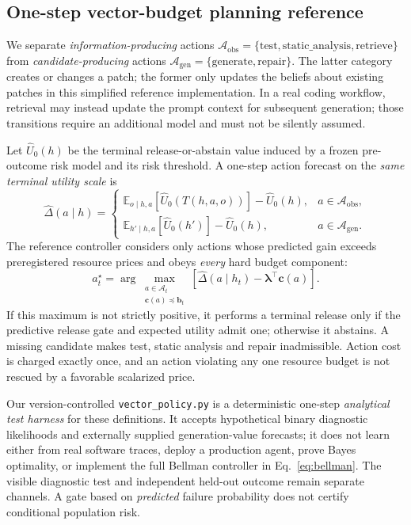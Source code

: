 \documentclass[pdflatex,sn-basic]{sn-jnl}
\begin{document}
\subsection{One-step vector-budget planning reference}\label{sec:planner}

We separate \emph{information-producing} actions
$\mathcal{A}_{\mathrm{obs}}=\{\mathrm{test},\mathrm{static\_analysis},
\mathrm{retrieve}\}$ from \emph{candidate-producing} actions
$\mathcal{A}_{\mathrm{gen}}=\{\mathrm{generate},\mathrm{repair}\}$.
The latter category creates or changes a patch; the former only
updates the beliefs about existing patches in this simplified reference
implementation. In a real coding workflow, retrieval may instead update
the prompt context for subsequent generation; those transitions require
an additional model and must not be silently assumed.

Let $\widehat U_0(h)$ be the terminal release-or-abstain value induced
by a frozen pre-outcome risk model and its risk threshold. A one-step
action forecast on the \emph{same terminal utility scale} is
\begin{equation}
 \widehat{\Delta}(a\mid h)=
 \begin{cases}
 \mathbb{E}_{o\mid h,a}
  [\widehat U_0(T(h,a,o))]-\widehat U_0(h),
 & a\in\mathcal{A}_{\mathrm{obs}},\\
 \mathbb{E}_{h'\mid h,a}
  [\widehat U_0(h')]-\widehat U_0(h),
 & a\in\mathcal{A}_{\mathrm{gen}}.
 \end{cases}
 \label{eq:one_step_gain}
\end{equation}
The reference controller considers only actions whose predicted gain
exceeds preregistered resource prices and obeys \emph{every} hard
budget component:
\begin{equation}
 a_t^\star=\arg\max_{\substack{a\in\mathcal A_t\\
 \mathbf c(a)\preceq\mathbf b_t}}
 \left[\widehat{\Delta}(a\mid h_t)
 -\boldsymbol\lambda^\top\mathbf c(a)\right].
 \label{eq:myopic}
\end{equation}
If this maximum is not strictly positive, it performs a terminal
release only if the predictive release gate and expected utility admit
one; otherwise it abstains. A missing candidate makes test, static
analysis and repair inadmissible. Action cost is charged exactly once,
and an action violating any one resource budget is not rescued by a
favorable scalarized price.

Our version-controlled \texttt{vector\_policy.py} is a deterministic
one-step \emph{analytical test harness} for these definitions. It accepts
hypothetical binary diagnostic likelihoods and externally supplied
generation-value forecasts; it does not learn either from real software
traces, deploy a production agent, prove Bayes optimality, or implement
the full Bellman controller in Eq.~\eqref{eq:bellman}. The visible
diagnostic test and independent held-out outcome remain separate
channels. A gate based on \emph{predicted} failure probability does not
certify conditional population risk.
\end{document}
